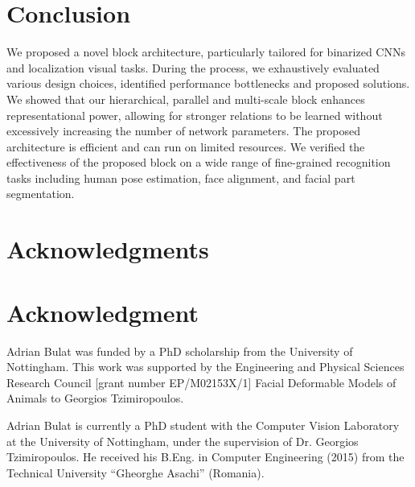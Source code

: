 \documentclass[10pt,journal,compsoc]{IEEEtran}
\begin{document}
\section{Conclusion} \label{sec:conclusion}
We proposed a novel block architecture, particularly tailored for binarized CNNs and localization visual tasks. During the process, we exhaustively evaluated various design choices, identified performance bottlenecks and proposed solutions. We showed that our hierarchical, parallel and multi-scale block enhances representational power, allowing for stronger relations to be learned without excessively increasing the number of network parameters. The proposed architecture is efficient and can run on limited resources. We verified the effectiveness of the proposed block on a wide range of fine-grained recognition tasks including human pose estimation, face alignment, and facial part segmentation.







\ifCLASSOPTIONcompsoc
\section*{Acknowledgments}
\else
\section*{Acknowledgment}
\fi

Adrian Bulat was funded by a PhD scholarship from the University of Nottingham. This work was supported by the Engineering and Physical Sciences Research Council [grant number EP/M02153X/1] Facial Deformable Models of Animals to Georgios Tzimiropoulos.

\ifCLASSOPTIONcaptionsoff
\newpage
\fi







{
    
    
}






\vfill

\begin{IEEEbiography}{Adrian Bulat}
    is currently a PhD student with the Computer Vision Laboratory at the University of Nottingham, under the supervision of Dr. Georgios Tzimiropoulos. He received his B.Eng. in Computer Engineering (2015) from the Technical University ``Gheorghe Asachi'' (Romania).
\end{IEEEbiography}
\end{document}

